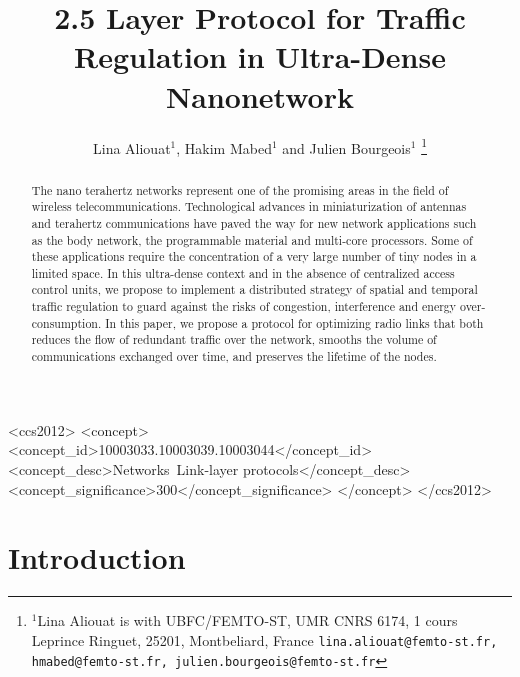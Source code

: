 \documentclass[letterpaper, 10 pt, conference]{ieeeconf}
\title{\LARGE \bf 2.5 Layer Protocol for Traffic Regulation in Ultra-Dense Nanonetwork}
\author{Lina Aliouat$^{1}$, Hakim Mabed$^{1}$ and Julien Bourgeois$^{1}$%
\thanks{$^{1}$Lina Aliouat is with UBFC/FEMTO-ST, UMR CNRS 6174, 1 cours Leprince Ringuet, 25201, Montbeliard, France
        {\tt\small lina.aliouat@femto-st.fr, hmabed@femto-st.fr, julien.bourgeois@femto-st.fr}}%
}
\begin{document}
\maketitle
\thispagestyle{empty}
\pagestyle{empty}





\begin{abstract}
The nano terahertz networks represent one of the promising areas in the field of wireless telecommunications. Technological advances in miniaturization of antennas and terahertz communications have paved the way for new network applications such as the body network, the programmable material and multi-core processors. Some of these applications require the concentration of a very large number of tiny nodes in a limited space. In this ultra-dense context and in the absence of centralized access control units, we propose to implement a distributed strategy of spatial and temporal traffic regulation to guard against the risks of congestion, interference and energy over-consumption. In this paper, we propose a protocol for optimizing radio links that both reduces the flow of redundant traffic over the network, smooths the volume of communications exchanged over time, and preserves the lifetime of the nodes.  
\end{abstract}

%
%
\begin{CCSXML}
<ccs2012>
<concept>
<concept_id>10003033.10003039.10003044</concept_id>
<concept_desc>Networks~Link-layer protocols</concept_desc>
<concept_significance>300</concept_significance>
</concept>
</ccs2012>
\end{CCSXML}




\maketitle

\section{Introduction}
\end{document}
